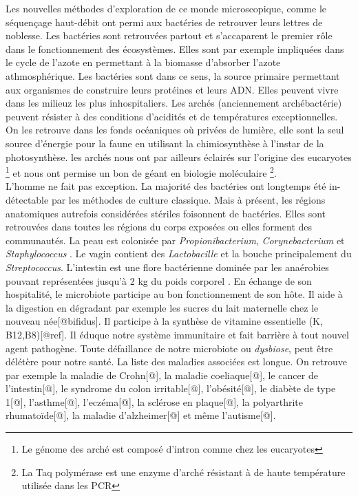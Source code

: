 \documentclass[12pt,a4paper]{article}
\begin{document}
Les nouvelles méthodes d'exploration de ce monde microscopique, comme le séquençage haut-débit ont permi aux bactéries de retrouver leurs lettres de noblesse.
Les bactéries sont retrouvées partout et s'accaparent le premier rôle dans le fonctionnement des écosystèmes. Elles sont par exemple impliquées dans le cycle de l'azote en permettant à la biomasse d'absorber l'azote athmosphérique. Les bactéries sont dans ce sens, la source primaire permettant aux organismes de construire leurs protéines et leurs ADN.
Elles peuvent vivre dans les milieuz les plus inhospitaliers. Les archés (anciennement archébactérie) peuvent résister à des conditions d'acidités et de températures exceptionnelles. On les retrouve dans les fonds océaniques où privées de lumière, elle sont la seul source d'énergie pour la faune en utilisant la chimiosynthèse à l'instar de la photosynthèse. les archés nous ont par ailleurs éclairés sur l’origine des eucaryotes \footnote{Le génome des arché est composé d'intron comme chez les eucaryotes} et nous ont permise un bon de géant en biologie moléculaire \footnote{La Taq polymérase est une enzyme d'arché résistant à de haute température utilisée dans les PCR}.\\
L'homme ne fait pas exception. La majorité des bactéries ont longtemps été in-détectable par les méthodes de culture classique. Mais à présent, les régions anatomiques autrefois considérées stériles foisonnent de bactéries. 
Elles sont retrouvées dans toutes les régions du corps exposées ou elles forment des communautés.
La peau est colonisée par \textit{Propionibacterium}, \textit{Corynebacterium} et \textit{Staphylococcus} \citep{Beck}. Le vagin contient des \textit{Lactobacille} et la bouche principalement du \textit{Streptococcus}\cite{Beck}.
L'intestin est une flore bactérienne dominée par les anaérobies pouvant représentées jusqu'à 2 kg du poids corporel \citep{Beck}.
En échange de son hospitalité, le microbiote participe au bon fonctionnement de son hôte. Il aide à la digestion en dégradant par exemple les sucres du lait maternelle chez le nouveau née[@bifidus]. Il participe à la synthèse de vitamine essentielle (K, B12,B8)[@ref]. Il éduque notre système immunitaire et fait barrière à tout nouvel agent pathogène.
Toute défaillance de notre microbiote ou \textit{dysbiose}, peut être délétère pour notre santé. La liste des maladies associées est longue. On retrouve par exemple la maladie de Crohn[@], la maladie coeliaque[@], le cancer de l’intestin[@], le syndrome du colon irritable[@], l’obésité[@], le diabète de type 1[@], l’asthme[@], l’eczéma[@], la sclérose en plaque[@], la polyarthrite rhumatoïde[@], la maladie d’alzheimer[@] et même l’autisme[@]. \\
\end{document}
